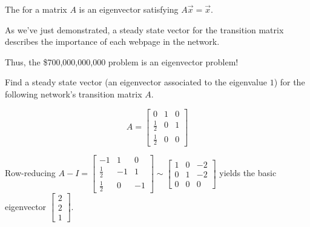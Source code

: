 \begin{applicationActivities}{5}{29}
\begin{fact}
The  for a matrix \(A\) is an eigenvector
satisfying \(A\vec{x}=\vec{x}\).

As we've just demonstrated, a steady state vector for the transition matrix
describes the importance of each webpage in the network.

Thus, the \$700,000,000,000 problem is an eigenvector problem!
\end{fact}

\begin{activity}{10}
Find a steady state vector (an eigenvector associated to the eigenvalue $1$)
for the following network's transition matrix \(A\).

\begin{multicols}{2}
\begin{center}
\end{center}

\[
  A
    =
  \begin{bmatrix}
    0 & 1 & 0 \\
    \frac{1}{2} & 0 & 1 \\
    \frac{1}{2} & 0 & 0
  \end{bmatrix}
\]
\end{multicols}
\end{activity}

\begin{observation}
Row-reducing
\(
  A-I
    =
  \begin{bmatrix}
    -1 & 1 & 0 \\
    \frac{1}{2} & -1 & 1 \\
    \frac{1}{2} & 0 & -1
  \end{bmatrix}
    \sim
  \begin{bmatrix}
    1 & 0 & -2 \\
    0 & 1 & -2 \\
    0 & 0 & 0
  \end{bmatrix}
\)
yields the basic eigenvector \(\begin{bmatrix} 2 \\ 2 \\1 \end{bmatrix}\).


\end{observation}
\end{applicationActivities}
